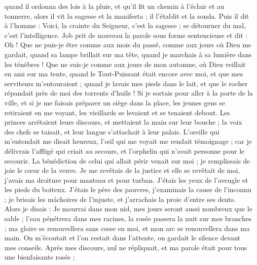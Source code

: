 \begin{multicols}{2}
quand il ordonna des lois à la pluie, et qu'il fit un chemin à l'éclair et au tonnerre,
alors il vit la sagesse et la manifesta ; il l'établit et la sonda.
Puis il dit à l'homme : Voici, la crainte du Seigneur, c'est la sagesse ; se détourner du mal, c'est l'intelligence.
\VerseOne{}Job prit de nouveau la parole sous forme sentencieuse et dit :
Oh ! Que ne puis-je être comme aux mois du passé, comme aux jours où Dieu me gardait,
quand sa lampe brillait sur ma tête, quand je marchais à sa lumière dans les ténèbres !
Que ne suis-je comme aux jours de mon automne, où Dieu veillait en ami sur ma tente,
quand le Tout-Puissant était encore avec moi, et que mes serviteurs m'entouraient ;
quand je lavais mes pieds dans le lait, et que le rocher répandait près de moi des torrents d'huile !
Si je sortais pour aller à la porte de la ville, et si je me faisais préparer un siège dans la place,
les jeunes gens se retiraient en me voyant, les vieillards se levaient et se tenaient debout.
Les princes arrêtaient leurs discours, et mettaient la main sur leur bouche ;
la voix des chefs se taisait, et leur langue s'attachait à leur palais.
L'oreille qui m'entendait me disait heureux, l'œil qui me voyait me rendait témoignage ;
car je délivrais l'affligé qui criait au secours, et l'orphelin qui n'avait personne pour le secourir.
La bénédiction de celui qui allait périr venait sur moi ; je remplissais de joie le cœur de la veuve.
Je me revêtais de la justice et elle se revêtait de moi, j'avais ma droiture pour manteau et pour turban.
J'étais les yeux de l'aveugle et les pieds du boiteux.
J'étais le père des pauvres, j'examinais la cause de l'inconnu ;
je brisais les mâchoires de l'injuste, et j'arrachais la proie d'entre ses dents.
Alors je disais : Je mourrai dans mon nid, mes jours seront aussi nombreux que le sable ;
l'eau pénétrera dans mes racines, la rosée passera la nuit sur mes branches ;
ma gloire se renouvellera sans cesse en moi, et mon arc se renouvellera dans ma main.
On m'écoutait et l'on restait dans l'attente, on gardait le silence devant mes conseils.
Après mes discours, nul ne répliquait, et ma parole était pour tous une bienfaisante rosée ;

\end{multicols}
